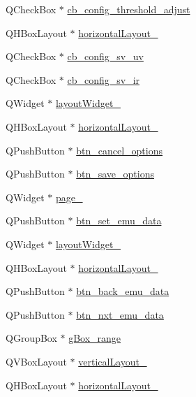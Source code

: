 \begin{DoxyCompactItemize}
\item 
Q\+Check\+Box $\ast$ \hyperlink{a00027_a433ffc427e1103e6c2939f949ee5e5b5}{cb\+\_\+config\+\_\+threshold\+\_\+adjust}
\item 
Q\+H\+Box\+Layout $\ast$ \hyperlink{a00027_a5a19bc8cf16dd2fbfa87ddaec41e2d75}{horizontal\+Layout\+\_}
\item 
Q\+Check\+Box $\ast$ \hyperlink{a00027_a3a93cd0a3f3738aad252d063a8677839}{cb\+\_\+config\+\_\+sv\+\_\+uv}
\item 
Q\+Check\+Box $\ast$ \hyperlink{a00027_a4db3ccfbbf8c5222dd2f042d3073bbe8}{cb\+\_\+config\+\_\+sv\+\_\+ir}
\item 
Q\+Widget $\ast$ \hyperlink{a00027_a11b1a1b252036633f800cedbf396286b}{layout\+Widget\+\_}
\item 
Q\+H\+Box\+Layout $\ast$ \hyperlink{a00027_acbfe65f9d2895246b00c82c815b5369e}{horizontal\+Layout\+\_}
\item 
Q\+Push\+Button $\ast$ \hyperlink{a00027_a39d7e34aed8750622569f0819dd7c8c2}{btn\+\_\+cancel\+\_\+options}
\item 
Q\+Push\+Button $\ast$ \hyperlink{a00027_a409e5b794dbab22d7b958be406b6a030}{btn\+\_\+save\+\_\+options}
\item 
Q\+Widget $\ast$ \hyperlink{a00027_a2a58b14a203be787ef1600453f795d71}{page\+\_}
\item 
Q\+Push\+Button $\ast$ \hyperlink{a00027_ad05944ce9c8afb0ab60549a326b8e0af}{btn\+\_\+set\+\_\+emu\+\_\+data}
\item 
Q\+Widget $\ast$ \hyperlink{a00027_a873441ec9cec68e0d4eacee271765553}{layout\+Widget\+\_}
\item 
Q\+H\+Box\+Layout $\ast$ \hyperlink{a00027_a9403b9a7c13814220caeb1748ef9e672}{horizontal\+Layout\+\_}
\item 
Q\+Push\+Button $\ast$ \hyperlink{a00027_ab6199bde688a9b2e91e192278190dda7}{btn\+\_\+back\+\_\+emu\+\_\+data}
\item 
Q\+Push\+Button $\ast$ \hyperlink{a00027_a11126ea7922009f1354c9bfefb93f5e9}{btn\+\_\+nxt\+\_\+emu\+\_\+data}
\item 
Q\+Group\+Box $\ast$ \hyperlink{a00027_a3c12d0504a310784c3820d1a9ad469c2}{g\+Box\+\_\+range}
\item 
Q\+V\+Box\+Layout $\ast$ \hyperlink{a00027_a0c01bad60d9f422a1258e710635a2f65}{vertical\+Layout\+\_}
\item 
Q\+H\+Box\+Layout $\ast$ \hyperlink{a00027_a03ce63974cc69b067c91bbf285cceca8}{horizontal\+Layout\+\_}
\item 

\end{DoxyCompactItemize}
